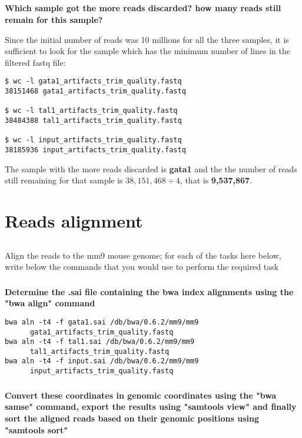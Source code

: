 \documentclass[12pt, a4paper]{article}
\begin{document}
\subsection{}
\textbf{Which sample got the more reads discarded? how many reads still remain for this sample?}

Since the initial number of reads was 10 millions for all the three samples, it is sufficient to look for the sample which has the minimum number of lines in the filtered fastq file:

\begin{verbatim}
$ wc -l gata1_artifacts_trim_quality.fastq 
38151468 gata1_artifacts_trim_quality.fastq

$ wc -l tal1_artifacts_trim_quality.fastq 
38484388 tal1_artifacts_trim_quality.fastq

$ wc -l input_artifacts_trim_quality.fastq 
38185936 input_artifacts_trim_quality.fastq
\end{verbatim}

The sample with the more reads discarded is \textbf{gata1} and the the number of reads still remaining for that sample is $38,151,468 \div 4$, that is \textbf{9,537,867}.

\section{Reads alignment}

\subsection{}
Align the reads to the mm9 mouse genome; for each of the tasks here below, write below the commands that you would use to perform the required task

\subsubsection{}
\textbf{Determine the .sai file containing the bwa index alignments using the "bwa align" command}

\begin{verbatim}
bwa aln -t4 -f gata1.sai /db/bwa/0.6.2/mm9/mm9
      gata1_artifacts_trim_quality.fastq
bwa aln -t4 -f tal1.sai /db/bwa/0.6.2/mm9/mm9
      tal1_artifacts_trim_quality.fastq
bwa aln -t4 -f input.sai /db/bwa/0.6.2/mm9/mm9
      input_artifacts_trim_quality.fastq
\end{verbatim}

\subsubsection{}
\textbf{Convert these coordinates in genomic coordinates using the "bwa samse" command, export the results using "samtools view" and finally sort the aligned reads based on their genomic positions using "samtools sort"}
\end{document}
